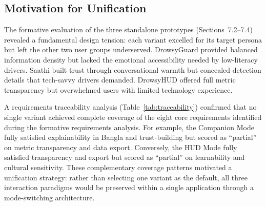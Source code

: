 \documentclass[sigconf]{acmart}
\begin{document}
\subsection{Motivation for Unification}
 
The formative evaluation of the three standalone prototypes (Sections~7.2--7.4) revealed a fundamental design tension: each variant excelled for its target persona but left the other two user groups underserved. DrowsyGuard provided balanced information density but lacked the emotional accessibility needed by low-literacy drivers. Saathi built trust through conversational warmth but concealed detection details that tech-savvy drivers demanded. DrowsyHUD offered full metric transparency but overwhelmed users with limited technology experience.
 
A requirements traceability analysis (Table~\ref{tab:traceability}) confirmed that no single variant achieved complete coverage of the eight core requirements identified during the formative requirements analysis. For example, the Companion Mode fully satisfied explainability in Bangla and trust-building but scored as ``partial'' on metric transparency and data export. Conversely, the HUD Mode fully satisfied transparency and export but scored as ``partial'' on learnability and cultural sensitivity. These complementary coverage patterns motivated a unification strategy: rather than selecting one variant as the default, all three interaction paradigms would be preserved within a single application through a mode-switching architecture.
 
\end{document}
